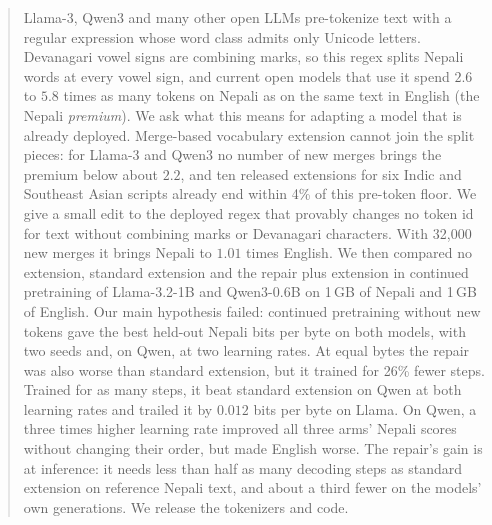 \begin{abstract}
Llama-3, Qwen3 and many other open LLMs pre-tokenize text with a regular expression whose word class admits only Unicode letters. Devanagari vowel signs are combining marks, so this regex splits Nepali words at every vowel sign, and current open models that use it spend $2.6$ to $5.8$ times as many tokens on Nepali as on the same text in English (the Nepali \emph{premium}). We ask what this means for adapting a model that is already deployed. Merge-based vocabulary extension cannot join the split pieces: for Llama-3 and Qwen3 no number of new merges brings the premium below about $2.2$, and ten released extensions for six Indic and Southeast Asian scripts already end within 4\% of this pre-token floor. We give a small edit to the deployed regex that provably changes no token id for text without combining marks or Devanagari characters. With 32{,}000 new merges it brings Nepali to $1.01$ times English. We then compared no extension, standard extension and the repair plus extension in continued pretraining of Llama-3.2-1B and Qwen3-0.6B on 1\,GB of Nepali and 1\,GB of English. Our main hypothesis failed: continued pretraining without new tokens gave the best held-out Nepali bits per byte on both models, with two seeds and, on Qwen, at two learning rates. At equal bytes the repair was also worse than standard extension, but it trained for 26\% fewer steps. Trained for as many steps, it beat standard extension on Qwen at both learning rates and trailed it by $0.012$ bits per byte on Llama. On Qwen, a three times higher learning rate improved all three arms' Nepali scores without changing their order, but made English worse. The repair's gain is at inference: it needs less than half as many decoding steps as standard extension on reference Nepali text, and about a third fewer on the models' own generations. We release the tokenizers and code.
\end{abstract}
